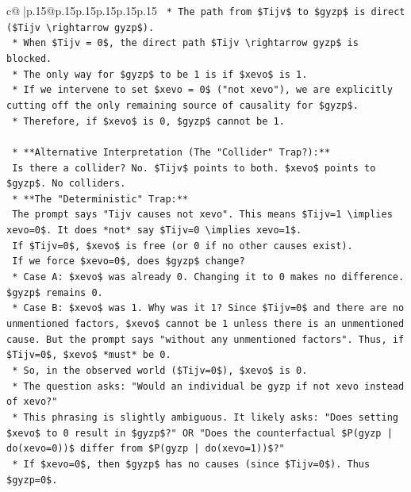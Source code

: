 \documentclass{article}
\begin{document}
{\begin{supertabular}{c@{$\;$}|p{.15\linewidth}@{}p{.15\linewidth}p{.15\linewidth}p{.15\linewidth}p{.15\linewidth}p{.15\linewidth}}
{{{\texttt{    *   The path from \$Tijv\$ to \$gyzp\$ is direct (\$Tijv \textbackslash{}rightarrow gyzp\$).} \\
\texttt{    *   When \$Tijv = 0\$, the direct path \$Tijv \textbackslash{}rightarrow gyzp\$ is blocked.} \\
\texttt{    *   The only way for \$gyzp\$ to be 1 is if \$xevo\$ is 1.} \\
\texttt{    *   If we intervene to set \$xevo = 0\$ ("not xevo"), we are explicitly cutting off the only remaining source of causality for \$gyzp\$.} \\
\texttt{    *   Therefore, if \$xevo\$ is 0, \$gyzp\$ cannot be 1.} \\
\\ 
\texttt{    *   **Alternative Interpretation (The "Collider" Trap?):**} \\
\texttt{        Is there a collider? No. \$Tijv\$ points to both. \$xevo\$ points to \$gyzp\$. No colliders.} \\
\texttt{    *   **The "Deterministic" Trap:**} \\
\texttt{        The prompt says "Tijv causes not xevo". This means \$Tijv=1 \textbackslash{}implies xevo=0\$. It does *not* say \$Tijv=0 \textbackslash{}implies xevo=1\$.} \\
\texttt{        If \$Tijv=0\$, \$xevo\$ is free (or 0 if no other causes exist).} \\
\texttt{        If we force \$xevo=0\$, does \$gyzp\$ change?} \\
\texttt{        *   Case A: \$xevo\$ was already 0. Changing it to 0 makes no difference. \$gyzp\$ remains 0.} \\
\texttt{        *   Case B: \$xevo\$ was 1. Why was it 1? Since \$Tijv=0\$ and there are no unmentioned factors, \$xevo\$ cannot be 1 unless there is an unmentioned cause. But the prompt says "without any unmentioned factors". Thus, if \$Tijv=0\$, \$xevo\$ *must* be 0.} \\
\texttt{        *   So, in the observed world (\$Tijv=0\$), \$xevo\$ is 0.} \\
\texttt{        *   The question asks: "Would an individual be gyzp if not xevo instead of xevo?"} \\
\texttt{        *   This phrasing is slightly ambiguous. It likely asks: "Does setting \$xevo\$ to 0 result in \$gyzp\$?" OR "Does the counterfactual \$P(gyzp | do(xevo=0))\$ differ from \$P(gyzp | do(xevo=1))\$?"} \\
\texttt{        *   If \$xevo=0\$, then \$gyzp\$ has no causes (since \$Tijv=0\$). Thus \$gyzp=0\$.} \\
}}}
\end{supertabular}}
\end{document}

